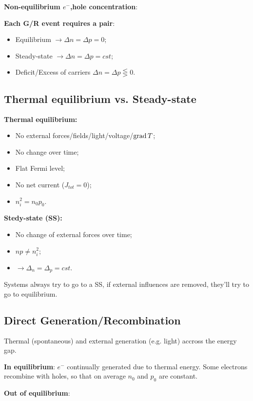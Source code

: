 \documentclass[a4paper, fontsize=8pt, landscape, DIV=1]{scrartcl}
\begin{document}
\begin{multicols*}{4}
\textbf{Non-equilibrium $e^-$,hole concentration}:

\textbf{Each G/R event requires a pair}:

\begin{itemize}[nolistsep, noitemsep]
	\item Equilibrium $\rightarrow \Delta n=\Delta p=0$;
	\item Steady-state $\rightarrow \Delta n=\Delta p=cst$;
	\item Deficit/Excess of carriers $\Delta n=\Delta p\lesseqgtr0$.
\end{itemize}

\subsection{Thermal equilibrium vs. Steady-state}
\textbf{Thermal equilibrium:}
\begin{itemize}[noitemsep,nolistsep]
	\item No external forces/fields/light/voltage/$\operatorname{grad} T$;
	\item No change over time;
	\item Flat Fermi level;
	\item No net current ($J_{tot}=0$);
	\item $n_i^2=n_0p_0$.
\end{itemize}
\textbf{Stedy-state (SS):}
\begin{itemize}[nolistsep,noitemsep]
	\item No change of external forces over time;
	\item $np\neq n_i^2$;
	\item $\rightarrow \Delta_n=\Delta_p=cst$.
\end{itemize}
Systems always try to go to a SS, if external influences are removed, they'll try to go to equilibrium.
\subsection{Direct Generation/Recombination}
Thermal (spontaneous) and external generation (e.g. light) accross the energy gap.

\textbf{In equilibrium}: $e^-$ continually generated due to thermal energy. Some electrons recombine with holes, so that on average $n_0$ and $p_0$ are constant. 

\textbf{Out of equilibrium}:


\end{multicols*}
\end{document}
